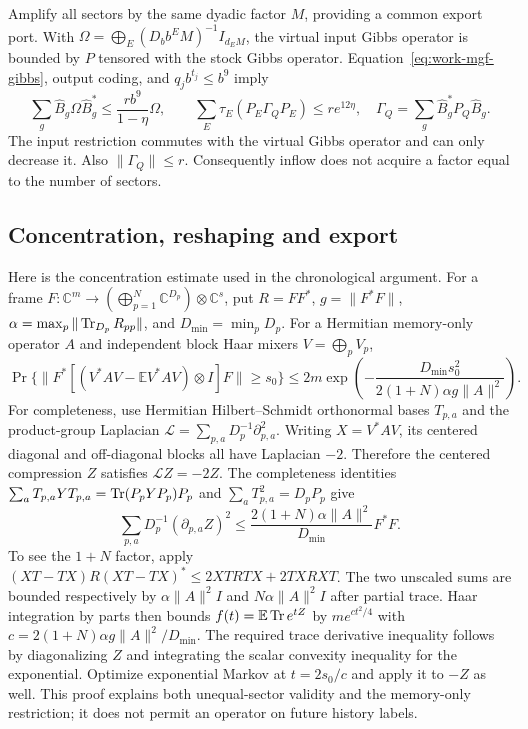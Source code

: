 Amplify all sectors by the same dyadic factor $M$, providing a common
export port. With
$\Omega=\bigoplus_E(D_b b^E M)^{-1}I_{d_EM}$,
the virtual input Gibbs operator is bounded by $P$ tensored with the
stock Gibbs operator. Equation~\eqref{eq:work-mgf-gibbs}, output coding,
and $q_jb^{t_j}\leq b^9$ imply
\begin{equation}\label{eq:graded-inflow}
 \sum_g\widehat B_g\Omega\widehat B_g^*
 \leq\frac{rb^9}{1-\eta}\Omega,\qquad
 \sum_E\tau_E(P_E\Gamma_QP_E)\leq re^{12\eta},
 \quad\Gamma_Q=\sum_g\widehat B_g^*P_Q\widehat B_g.
\end{equation}
The input restriction commutes with the virtual Gibbs operator and
can only decrease it. Also $\|\Gamma_Q\|\leq r$. Consequently inflow
does not acquire a factor equal to the number of sectors.

\subsection{Concentration, reshaping and export}
Here is the concentration estimate used in the chronological argument.
For a frame $F:\mathbb C^m\to(\bigoplus_{p=1}^N\mathbb C^{D_p})
\otimes\mathbb C^s$, put $R=FF^*$,
$g=\|F^*F\|$, $\alpha=\max_p\|\operatorname{Tr}_{D_p}R_{pp}\|$,
and $D_{\min}=\min_pD_p$. For a Hermitian memory-only operator $A$
and independent block Haar mixers $V=\bigoplus_pV_p$,
\begin{equation}\label{eq:unequal-concentration}
 \Pr\{\|F^*[(V^*AV-\mathbb EV^*AV)\otimes I]F\|\geq s_0\}
 \leq2m\exp\left(-\frac{D_{\min}s_0^2}
 {2(1+N)\alpha g\|A\|^2}\right).
\end{equation}
For completeness, use Hermitian Hilbert--Schmidt orthonormal bases
$T_{p,a}$ and the product-group Laplacian
$\mathcal L=\sum_{p,a}D_p^{-1}\partial_{p,a}^2$.
Writing $X=V^*AV$, its centered diagonal and off-diagonal blocks all
have Laplacian $-2$. Therefore the centered compression $Z$ satisfies
$\mathcal LZ=-2Z$. The completeness identities
$\sum_aT_{p,a}YT_{p,a}=\operatorname{Tr}(P_pYP_p)P_p$ and
$\sum_aT_{p,a}^2=D_pP_p$ give
\[
 \sum_{p,a}D_p^{-1}(\partial_{p,a}Z)^2
 \leq \frac{2(1+N)\alpha\|A\|^2}{D_{\min}}F^*F.
\]
To see the $1+N$ factor, apply
$(XT-TX)R(XT-TX)^*\leq2XTRTX+2TXRXT$.
The two unscaled sums are bounded respectively by
$\alpha\|A\|^2I$ and $N\alpha\|A\|^2I$ after partial trace.
Haar integration by parts then bounds
$f(t)=\mathbb E\operatorname{Tr} e^{tZ}$ by $m e^{ct^2/4}$ with
$c=2(1+N)\alpha g\|A\|^2/D_{\min}$.
The required trace derivative inequality follows by diagonalizing $Z$
and integrating the scalar convexity inequality for the exponential.
Optimize exponential Markov at $t=2s_0/c$ and apply it to $-Z$ as well.
This proof explains both unequal-sector validity and the memory-only
restriction; it does not permit an operator on future history labels.

